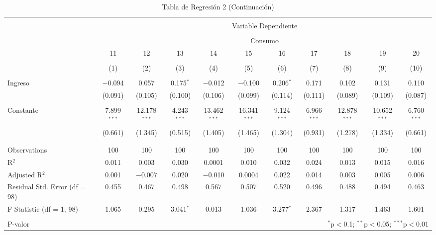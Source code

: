 \documentclass[
]{article}
\begin{document}
\begin{landscape}
\begin{table}[!htbp] \centering 
  \caption{Tabla de Regresión 2 (Continuación)} 
  \label{} 
\footnotesize 
\begin{tabular}{@{\extracolsep{5pt}}lcccccccccc} 
\\[-1.8ex]\hline 
\hline \\[-1.8ex] 
 & \multicolumn{10}{c}{Variable Dependiente} \\ 
\cline{2-11} 
\\[-1.8ex] & \multicolumn{10}{c}{Consumo} \\ 
 & 11 & 12 & 13 & 14 & 15 & 16 & 17 & 18 & 19 & 20 \\ 
\\[-1.8ex] & (1) & (2) & (3) & (4) & (5) & (6) & (7) & (8) & (9) & (10)\\ 
\hline \\[-1.8ex] 
 Ingreso & $-$0.094 & 0.057 & 0.175$^{*}$ & $-$0.012 & $-$0.100 & 0.206$^{*}$ & 0.171 & 0.102 & 0.131 & 0.110 \\ 
  & (0.091) & (0.105) & (0.100) & (0.106) & (0.099) & (0.114) & (0.111) & (0.089) & (0.109) & (0.087) \\ 
  & & & & & & & & & & \\ 
 Constante & 7.899$^{***}$ & 12.178$^{***}$ & 4.243$^{***}$ & 13.462$^{***}$ & 16.341$^{***}$ & 9.124$^{***}$ & 6.966$^{***}$ & 12.878$^{***}$ & 10.652$^{***}$ & 6.760$^{***}$ \\ 
  & (0.661) & (1.345) & (0.515) & (1.405) & (1.465) & (1.304) & (0.931) & (1.278) & (1.334) & (0.661) \\ 
  & & & & & & & & & & \\ 
\hline \\[-1.8ex] 
Observations & 100 & 100 & 100 & 100 & 100 & 100 & 100 & 100 & 100 & 100 \\ 
R$^{2}$ & 0.011 & 0.003 & 0.030 & 0.0001 & 0.010 & 0.032 & 0.024 & 0.013 & 0.015 & 0.016 \\ 
Adjusted R$^{2}$ & 0.001 & $-$0.007 & 0.020 & $-$0.010 & 0.0004 & 0.022 & 0.014 & 0.003 & 0.005 & 0.006 \\ 
Residual Std. Error (df = 98) & 0.455 & 0.467 & 0.498 & 0.567 & 0.507 & 0.520 & 0.496 & 0.488 & 0.494 & 0.463 \\ 
F Statistic (df = 1; 98) & 1.065 & 0.295 & 3.041$^{*}$ & 0.013 & 1.036 & 3.277$^{*}$ & 2.367 & 1.317 & 1.463 & 1.601 \\ 
\hline 
\hline \\[-1.8ex] 
P-valor & \multicolumn{10}{r}{$^{*}$p$<$0.1; $^{**}$p$<$0.05; $^{***}$p$<$0.01} \\ 
\end{tabular} 
\end{table} 

\end{landscape}
\end{document}
